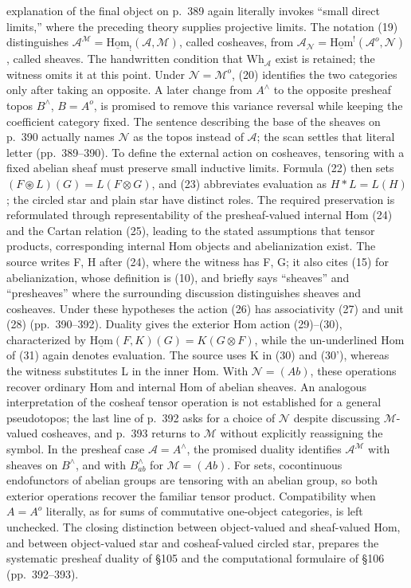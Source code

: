 explanation of the final object on p.\ 389 again literally invokes ``small direct limits,'' where the preceding theory supplies projective limits. The notation (19) distinguishes $\mathcal A^{\mathcal M}=\underline{\mathrm{Hom}}_!(\mathcal A,\mathcal M)$, called cosheaves, from $\mathcal A_{\mathcal N}=\underline{\mathrm{Hom}}^!(\mathcal A^o,\mathcal N)$, called sheaves. The handwritten condition that $\mathrm{Wh}_{\mathcal A}$ exist is retained; the witness omits it at this point. Under $\mathcal N=\mathcal M^o$, (20) identifies the two categories only after taking an opposite. A later change from $A^\wedge$ to the opposite presheaf topos $B^\wedge$, $B=A^o$, is promised to remove this variance reversal while keeping the coefficient category fixed. The sentence describing the base of the sheaves on p.\ 390 actually names $\mathcal N$ as the topos instead of $\mathcal A$; the scan settles that literal letter (pp.\ 389--390). To define the external action on cosheaves, tensoring with a fixed abelian sheaf must preserve small inductive limits. Formula (22) then sets $(F\circledast L)(G)=L(F\otimes G)$, and (23) abbreviates evaluation as $H*L=L(H)$; the circled star and plain star have distinct roles. The required preservation is reformulated through representability of the presheaf-valued internal Hom (24) and the Cartan relation (25), leading to the stated assumptions that tensor products, corresponding internal Hom objects and abelianization exist. The source writes F, H after (24), where the witness has F, G; it also cites (15) for abelianization, whose definition is (10), and briefly says ``sheaves'' and ``presheaves'' where the surrounding discussion distinguishes sheaves and cosheaves. Under these hypotheses the action (26) has associativity (27) and unit (28) (pp.\ 390--392). Duality gives the exterior Hom action (29)--(30), characterized by $\underline{\mathrm{Hom}}(F,K)(G)=K(G\otimes F)$, while the un-underlined Hom of (31) again denotes evaluation. The source uses K in (30) and (30'), whereas the witness substitutes L in the inner Hom. With $\mathcal N=(Ab)$, these operations recover ordinary Hom and internal Hom of abelian sheaves. An analogous interpretation of the cosheaf tensor operation is not established for a general pseudotopos; the last line of p.\ 392 asks for a choice of $\mathcal N$ despite discussing $\mathcal M$-valued cosheaves, and p.\ 393 returns to $\mathcal M$ without explicitly reassigning the symbol. In the presheaf case $\mathcal A=A^\wedge$, the promised duality identifies $\mathcal A^{\mathcal M}$ with sheaves on $B^\wedge$, and with $B^\wedge_{ab}$ for $\mathcal M=(Ab)$. For sets, cocontinuous endofunctors of abelian groups are tensoring with an abelian group, so both exterior operations recover the familiar tensor product. Compatibility when $A=A^o$ literally, as for sums of commutative one-object categories, is left unchecked. The closing distinction between object-valued and sheaf-valued Hom, and between object-valued star and cosheaf-valued circled star, prepares the systematic presheaf duality of \S105 and the computational formulaire of \S106 (pp.\ 392--393).
